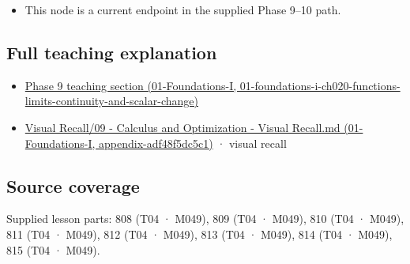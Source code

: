 \begin{itemize}
\tightlist
\item
  This node is a current endpoint in the supplied Phase 9--10 path.
\end{itemize}

\subsection{Full teaching explanation}\label{appendix-d9f70bdfbc92-full-teaching-explanation}

\begin{itemize}
\tightlist
\item
  \href{../01-Foundations-I/main.pdf\#nameddest=01-foundations-i-ch020-functions-limits-continuity-and-scalar-change}{Phase 9 teaching section (01-Foundations-I, 01-foundations-i-ch020-functions-limits-continuity-and-scalar-change)}
\item
  \href{../01-Foundations-I/main.pdf\#nameddest=appendix-adf48f5dc5c1}{Visual Recall/09 - Calculus and Optimization - Visual Recall.md (01-Foundations-I, appendix-adf48f5dc5c1)} · visual recall
\end{itemize}

\subsection{Source coverage}\label{appendix-d9f70bdfbc92-source-coverage}

Supplied lesson parts: 808 (T04 · M049), 809 (T04 · M049), 810 (T04 · M049), 811 (T04 · M049), 812 (T04 · M049), 813 (T04 · M049), 814 (T04 · M049), 815 (T04 · M049).
